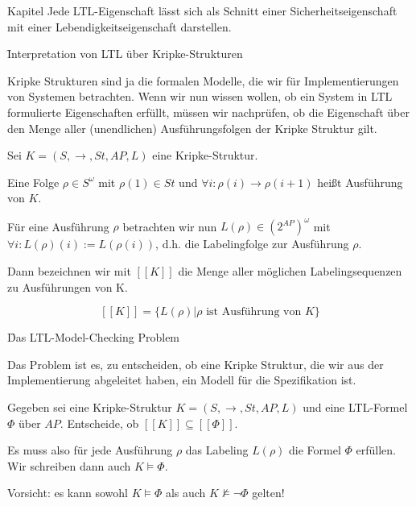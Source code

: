 \begin{chapter}{Kapitel}
\noindent Jede LTL-Eigenschaft lässt sich als Schnitt einer Sicherheitseigenschaft mit einer Lebendigkeitseigenschaft darstellen. 
\vspace*{4pt}

\f{Interpretation von LTL über Kripke-Strukturen  }
\vspace*{5pt}

\noindent Kripke Strukturen sind ja die formalen Modelle, die wir für Implementierungen von Systemen betrachten. Wenn wir nun wissen wollen, ob ein System in LTL 
formulierte Eigenschaften erfüllt, müssen wir nachprüfen, ob die Eigenschaft über den Menge aller (unendlichen) Ausführungsfolgen der Kripke Struktur gilt. 
\vspace*{4pt}

\noindent Sei $K = (S,\rightarrow, St, AP,L)$ eine Kripke-Struktur. 
\vspace*{4pt}

\noindent Eine Folge $\rho \in S^\omega$ mit $\rho(1)\in St$ und $\forall i:\rho(i)\rightarrow \rho(i+1)$ heißt Ausführung von $K$.
\vspace*{4pt}

\noindent Für eine Ausführung $\rho$ betrachten wir nun  $L(\rho) \in \left(2^{AP}\right)^\omega$ mit $\forall i: L(\rho)(i):=L(\rho(i))$, d.h. die 
Labelingfolge zur Ausführung $\rho$. 
\vspace*{4pt}

\noindent Dann bezeichnen wir mit $[[K]]$ die Menge aller möglichen Labelingsequenzen zu Ausführungen von K. 
\vspace*{4pt}

\[[[K]] = \{L(\rho)|\rho \text{ ist Ausführung von } K \}\]

\f{Das LTL-Model-Checking Problem}
\vspace*{4pt}

\noindent Das Problem ist es, zu entscheiden, ob eine Kripke Struktur, die wir aus der Implementierung abgeleitet haben, ein Modell für die Spezifikation ist. 
\vspace*{4pt}

\noindent Gegeben sei eine Kripke-Struktur $K=(S,\rightarrow, St,AP,L)$ und eine LTL-Formel $\Phi$ über $AP$. Entscheide, ob $[[K]] \subseteq [[\Phi]]$.
\vspace*{4pt} 

\noindent Es muss also für jede Ausführung $\rho$ das Labeling $L(\rho)$ die Formel $\Phi$ erfüllen. Wir schreiben dann auch $K \vDash \Phi$.

\noindent Vorsicht: es kann sowohl $K \vDash \Phi$ als auch $K \nvDash \neg\Phi$ gelten!
\vspace*{6pt}


\end{chapter}
